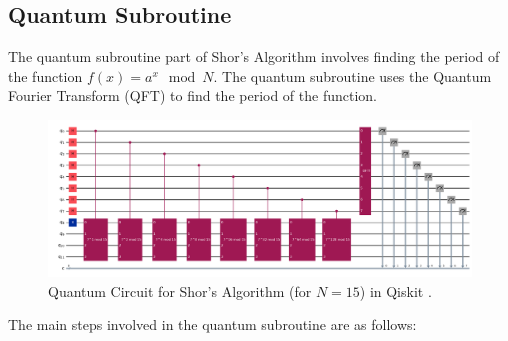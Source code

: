 \documentclass[12pt]{article}
\begin{document}
\subsection{Quantum Subroutine}
The quantum subroutine part of Shor's Algorithm involves finding the period of the function $f(x) = a^x \mod N$. The quantum subroutine uses the Quantum Fourier Transform (QFT) to find the period of the function.
\begin{figure}[H]
    \centering
    \includegraphics[height=0.53\textwidth, angle=-90,origin=c]{../shors.png}
    \caption{Quantum Circuit for Shor's Algorithm (for $N=15$) in Qiskit \cite{qiskit}.}
\end{figure}
\par\noindent The main steps involved in the quantum subroutine are as follows:
\end{document}
